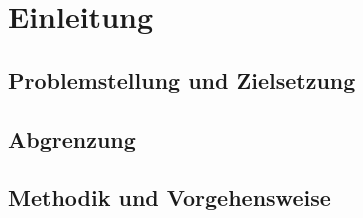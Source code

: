 \newpage
\section{Einleitung}
\subsection{Problemstellung und Zielsetzung}
\subsection{Abgrenzung}
\subsection{Methodik und Vorgehensweise}